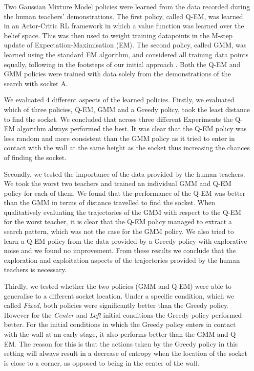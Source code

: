 \documentclass[final,3p,times,twocolumn]{elsarticle}
\begin{document}
Two Gaussian Mixture Model policies were learned from the data recorded during the human teachers' demonstrations. 
The first policy, called Q-EM, was learned in an Actor-Critic RL framework in which a value function was learned over 
the belief space. This was then used to weight training datapoints in the M-step update of Expectation-Maximisation (EM). The second 
policy, called GMM, was learned using the standard EM algorithm, and considered all training data points equally,
following in the footsteps of our initial approach \cite{Chambrier2014}. Both the Q-EM and GMM policies were trained 
with data solely from the demonstrations of the search with socket A.

We evaluated 4 different aspects of the learned policies. Firstly, we evaluated which of three policies, Q-EM, GMM and a Greedy policy, 
took the least distance to find the socket. We concluded that across three different Experiments the Q-EM algorithm always performed
the best. It was clear that the Q-EM policy was less random and more consistent than the GMM policy as it tried to enter in 
contact with the wall at the same height as the socket thus increasing the chances of finding the socket.

Secondly, we tested the importance of the data provided by the human teachers. We took the worst two teachers and trained an
individual GMM and Q-EM policy for each of them. We found that the performance of the Q-EM was better than the GMM in terms 
of distance travelled to find the socket. When qualitatively evaluating the trajectories of the GMM with respect to the 
Q-EM for the worst teacher, it is clear that the Q-EM policy managed to extract a search pattern, which was not the case 
for the GMM policy. We also tried to learn a Q-EM policy from the data provided by a Greedy policy with explorative noise 
and we found no improvement. From these results we conclude that the exploration and exploitation aspects of the trajectories 
provided by the human teachers is necessary.

Thirdly, we tested whether the two policies (GMM and Q-EM) were able to generalise to a different socket location. Under a specific condition,
which we called \textit{Fixed}, both policies were significantly better than the Greedy policy. However for the \textit{Center}
and \textit{Left} initial conditions the Greedy policy performed better. For the initial conditions in which the Greedy policy 
enters in contact with the wall at an early stage, it also performs better than the GMM and Q-EM. The reason for this is that  
the actions taken by the Greedy policy in this setting will always result in a decrease of entropy when the location
of the socket is close to a corner, as opposed to being in the center of the wall.
\end{document}
